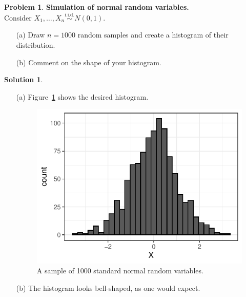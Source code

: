 \documentclass[11pt,letterpaper,english,oneside]{article} %
\theoremstyle{definition} %
\newtheorem{problem}{Problem}
\newtheorem{solution}{Solution}
\newenvironment{prob}{\clearpage \begin{problem}\hspace{0pt}}{\end{problem}}
\newenvironment{sol}{\begin{solution}\hspace{0pt}}{\end{solution}}
\begin{document}
\begin{prob} \textbf{Simulation of normal random variables.} \\

\noindent Consider $X_1, \dots, X_n \overset{\text{i.i.d.}}\sim N(0,1)$.
\begin{enumerate}
\item[(a)] Draw $n = 1000$ random samples and create a histogram of their distribution.
\item[(b)] Comment on the shape of your histogram.
\end{enumerate}

\end{prob}
\begin{sol}

\begin{enumerate}
\item[(a)] Figure~\ref{fig:std-norm-hist} shows the desired histogram.

\begin{figure}[h!]
\centering
\includegraphics{figures-and-tables/normal-histogram.pdf}
\caption{A sample of 1000 standard normal random variables.}
\label{fig:std-norm-hist}
\end{figure}

\item[(b)] The histogram looks bell-shaped, as one would expect.
\end{enumerate}

\end{sol}
\end{document}
